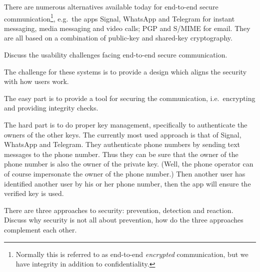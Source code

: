\question[3]
  There are numerous alternatives available today for end-to-end secure 
  communication\footnote{%
    Normally this is referred to as end-to-end \emph{encrypted} communication, 
    but we have integrity in addition to confidentiality.
  }, e.g.\ the apps Signal, WhatsApp and Telegram for instant messaging, media 
  messaging and video calls; PGP and S/MIME for email.
  They are all based on a combination of public-key and shared-key cryptography.

  Discuss the usability challenges facing end-to-end secure communication.

  \begin{solution}
    The challenge for these systems is to provide a design which aligns the 
    security with how users work.

    The easy part is to provide a tool for securing the communication, i.e.\ 
    encrypting and providing integrity checks.

    The hard part is to do proper key management, specifically to authenticate 
    the owners of the other keys.
    The currently most used approach is that of Signal, WhatsApp and Telegram.
    They authenticate phone numbers by sending text messages to the phone 
    number.
    Thus they can be sure that the owner of the phone number is also the owner 
    of the private key.
    (Well, the phone operator can of course impersonate the owner of the phone 
    number.)
    Then another user has identified another user by his or her phone number, 
    then the app will ensure the verified key is used.
  \end{solution}

\question[3]
  There are three approaches to security: prevention, detection and reaction.
  Discuss why security is not all about prevention, how do the three approaches 
  complement each other.

